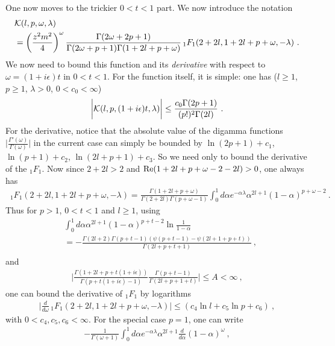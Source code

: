 \documentclass[a4paper,11pt]{article}
\begin{document}
One now moves to the trickier $0<t<1$ part. We now introduce the notation
\begin{align}
&{\cal K}(l,p,\omega,\lambda)\nonumber \\ 
&=\left(\frac{z^2m^2}{4}\right)^{\omega}\frac{\Gamma(2\omega+2p+1)}{\Gamma(2\omega+p+1)\Gamma(1+2l+p+\omega)}\,_1F_1(2+2l,1+2l+p+\omega,-\lambda) \ .
\end{align}
We now need to bound this function and its {\it derivative} with respect to $\omega=(1+i\epsilon)t$  in $ 0< t<1$. For the function itself, it is simple: one has ($l\ge 1$, $p\ge 1$, $\lambda>0$, $0<c_0<\infty$)
\begin{align}
\bigg|{\cal K}(l,p,(1+i\epsilon)t,\lambda)\bigg| \le \frac{c_0\Gamma(2p+1)}{(p!)^2\Gamma(2l)} \ .
\end{align}
For the derivative, notice that the absolute value of the digamma functions $\bigg|\frac{\Gamma'(\omega)}{\Gamma(\omega)}\bigg|$ in the current case can simply be bounded by $\ln(2p+1)+c_1$, $\ln(p+1)+c_2$, $\ln(2l+p+1)+c_3$. So we need only to bound the derivative of the $_1F_1$. Now since $2+2l>2$ and ${\rm Re}(1+2l+p+\omega-2-2l)>0$, one always has 
\begin{align}
\,_1F_1(2+2l,1+2l+p+\omega,-\lambda)=\frac{\Gamma(1+2l+p+\omega)}{\Gamma(2+2l)\Gamma(p+\omega-1)}\int_0^1 d\alpha e^{-\alpha \lambda}\alpha^{2l+1}(1-\alpha)^{p+\omega-2} \ .
\end{align}
Thus for $p>1$, $ 0<t<1$ and $l\ge 1$, using  \begin{align}
&\int_{0}^1 d\alpha \alpha^{2l+1}(1-\alpha)^{p+t-2}\ln \frac{1}{1-\alpha}\nonumber \\ 
&=-\frac{\Gamma (2 l+2) \Gamma (p+t-1) \left(\psi(p+t-1)-\psi(2l+1+p+t)\right)}{\Gamma (2 l+p+t+1)} \ , \nonumber \\ 
\end{align}
and
\begin{align}
\bigg|\frac{\Gamma(1+2l+p+t(1+i\epsilon))}{\Gamma(p+t(1+i\epsilon)-1)}\frac{\Gamma(p+t-1)}{\Gamma(2l+p+1+t)}\bigg| \le A<\infty \ ,
\end{align}
one can bound the derivative of $_1F_1$ by logarithms 
\begin{align}
\bigg|\frac{d}{d\omega} \,_1F_1(2+2l,1+2l+p+\omega,-\lambda)\bigg| \le (c_4\ln l+c_5\ln p+c_6) \ ,
\end{align}
with $0<c_4,c_5,c_6<\infty$. For the special case $p=1$, one can write
\begin{align}
-\frac{1}{\Gamma(\omega+1)}\int_{0}^1 d\alpha e^{-\alpha \lambda}\alpha^{2l+1}\frac{d}{d\alpha}(1-\alpha)^{\omega} \ ,
\end{align}
\end{document}
